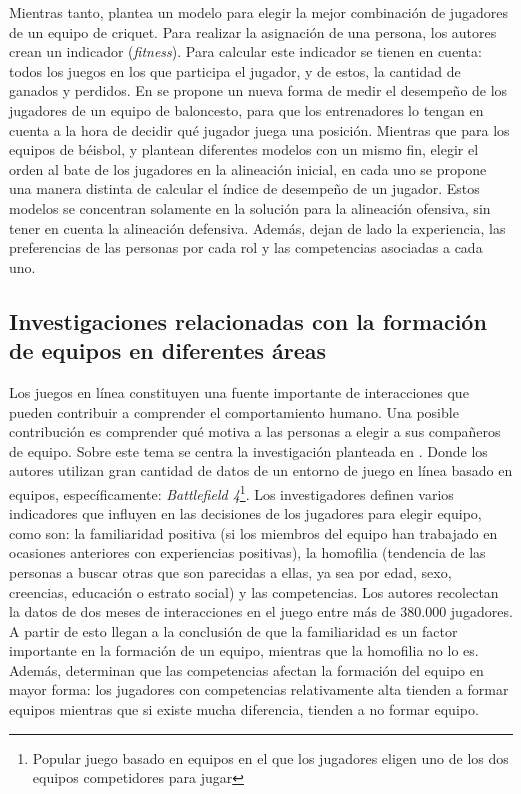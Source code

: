 Mientras tanto, \cite{Burney2012} plantea un modelo para elegir la mejor combinación de jugadores de un equipo de criquet. Para realizar la asignación de una persona, los autores crean un indicador (\textit{fitness}). Para calcular este indicador se tienen en cuenta: todos los juegos en los que participa el jugador, y de estos, la cantidad de ganados y perdidos. En \cite{Cooper2009} se propone un nueva forma de medir el desempeño de los jugadores de un equipo de baloncesto, para que los entrenadores lo tengan en cuenta a la hora de decidir qué jugador juega una posición. Mientras que para los equipos de béisbol, \cite{Polyashuk2015} y \cite{Sugrue2007} plantean diferentes modelos con un mismo fin, elegir el orden al bate de los jugadores en la alineación inicial, en cada uno se propone una manera distinta de calcular el índice de desempeño de un jugador. Estos modelos se concentran solamente en la solución para la alineación ofensiva, sin tener en cuenta la alineación defensiva. Además, dejan de lado la experiencia, las preferencias de las personas por cada rol y las competencias asociadas a cada uno.


\subsection{Investigaciones relacionadas con la formación de equipos en diferentes áreas}
Los juegos en línea constituyen una fuente importante de interacciones que pueden contribuir a comprender el comportamiento humano. Una posible contribución es comprender qué motiva a las personas a elegir a sus compañeros de equipo. Sobre este tema se centra la investigación planteada en \cite{Alhazmi2017}. Donde los autores utilizan gran cantidad de datos de un entorno de juego en línea basado en equipos, específicamente: \textit{Battlefield 4}\footnote{Popular juego basado en equipos en el que los jugadores eligen uno de los dos equipos competidores para jugar}. Los investigadores definen varios indicadores que influyen en las decisiones de los jugadores para elegir equipo, como son: la familiaridad positiva (si los miembros del equipo han trabajado en ocasiones anteriores con experiencias positivas), la homofilia (tendencia de las personas a buscar otras que son parecidas a ellas, ya sea por edad, sexo, creencias, educación o estrato social) y las competencias. Los autores recolectan la datos de dos meses de interacciones en el juego entre más de 380.000 jugadores. A partir de esto llegan a la conclusión de que la familiaridad es un factor importante en la formación de un equipo, mientras que la homofilia no lo es. Además, determinan que las competencias afectan la formación del equipo en mayor forma: los jugadores con competencias relativamente alta tienden a formar equipos mientras que si existe mucha diferencia, tienden a no formar equipo.\\

